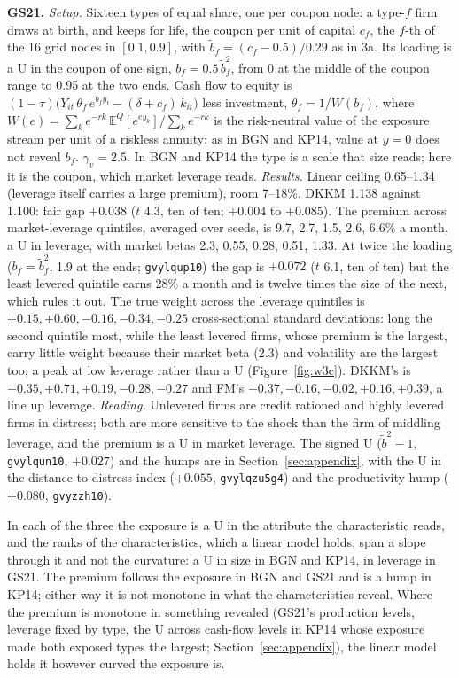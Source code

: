 \documentclass[11pt]{article}
\begin{document}
\noindent\textbf{GS21.} \emph{Setup.} Sixteen types of equal share, one per coupon node: a type-$f$ firm draws at birth, and keeps for life, the coupon per unit of capital $c_f$, the $f$-th of the 16 grid nodes in $[0.1, 0.9]$, with $\tilde b_f = (c_f - 0.5)/0.29$ as in 3a. Its loading is a U in the coupon of one sign, $b_f = 0.5\,\tilde b_f^2$, from 0 at the middle of the coupon range to 0.95 at the two ends. Cash flow to equity is $(1-\tau)\big(Y_{it}\,\theta_f\,e^{b_f y_t} - (\delta + c_f)\,k_{it}\big)$ less investment, $\theta_f = 1/W(b_f)$, where $W(e) = \sum_k e^{-rk}\,\mathbb{E}^Q[e^{e y_k}] / \sum_k e^{-rk}$ is the risk-neutral value of the exposure stream per unit of a riskless annuity: as in BGN and KP14, value at $y = 0$ does not reveal $b_f$. $\gamma_v = 2.5$. In BGN and KP14 the type is a scale that size reads; here it is the coupon, which market leverage reads. \emph{Results.} Linear ceiling 0.65--1.34 (leverage itself carries a large premium), room 7--18\%. DKKM 1.138 against 1.100: fair gap $+0.038$ ($t$ 4.3, ten of ten; $+0.004$ to $+0.085$). The premium across market-leverage quintiles, averaged over seeds, is 9.7, 2.7, 1.5, 2.6, 6.6\% a month, a U in leverage, with market betas 2.3, 0.55, 0.28, 0.51, 1.33. At twice the loading ($b_f = \tilde b_f^2$, 1.9 at the ends; \texttt{gvylqup10}) the gap is $+0.072$ ($t$ 6.1, ten of ten) but the least levered quintile earns 28\% a month and is twelve times the size of the next, which rules it out. The true weight across the leverage quintiles is $+0.15, +0.60, -0.16, -0.34, -0.25$ cross-sectional standard deviations: long the second quintile most, while the least levered firms, whose premium is the largest, carry little weight because their market beta (2.3) and volatility are the largest too; a peak at low leverage rather than a U (Figure~\ref{fig:w3c}). DKKM's is $-0.35, +0.71, +0.19, -0.28, -0.27$ and FM's $-0.37, -0.16, -0.02, +0.16, +0.39$, a line up leverage. \emph{Reading.} Unlevered firms are credit rationed and highly levered firms in distress; both are more sensitive to the shock than the firm of middling leverage, and the premium is a U in market leverage. The signed U ($\tilde b^2 - 1$, \texttt{gvylqun10}, $+0.027$) and the humps are in Section~\ref{sec:appendix}, with the U in the distance-to-distress index ($+0.055$, \texttt{gvylqzu5g4}) and the productivity hump ($+0.080$, \texttt{gvyzzh10}).

\noindent In each of the three the exposure is a U in the attribute the characteristic reads, and the ranks of the characteristics, which a linear model holds, span a slope through it and not the curvature: a U in size in BGN and KP14, in leverage in GS21. The premium follows the exposure in BGN and GS21 and is a hump in KP14; either way it is not monotone in what the characteristics reveal. Where the premium is monotone in something revealed (GS21's production levels, leverage fixed by type, the U across cash-flow levels in KP14 whose exposure made both exposed types the largest; Section~\ref{sec:appendix}), the linear model holds it however curved the exposure is.
\end{document}
